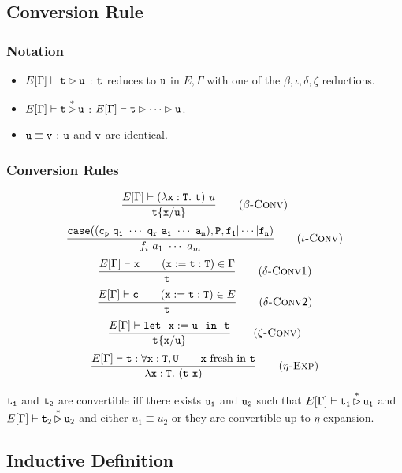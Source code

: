 \subsection{Conversion Rule}

\subsubsection{Notation}
\begin{itemize}
    \item $E[\Gamma]\vdash \tt t\rhd u$ : $\tt t$ reduces to $\tt u$ in $E,\Gamma$ with 
    one of the $\beta,\iota,\delta,\zeta$ reductions.
    \item $E[\Gamma]\vdash \tt t\mathop{\rhd}\limits^* u$ : $E[\Gamma]\vdash\tt t\rhd\cdots\rhd u$.
    \item $\tt u\equiv v$ : $\tt u$ and $\tt v$ are identical.
\end{itemize}

\subsubsection{Conversion Rules}
\begin{equation*}
\frac{E[\Gamma]\vdash(\lambda{\tt x:T.\ t})\ u}
    {\tt t\{x/u\}}
    \tag{\sc $\beta$-Conv}
\end{equation*}
\begin{equation*}
\frac{\tt case((c_p\ q_1\ \cdots\ q_r\ a_1\ \cdots\ a_m),P,f_1|\cdots|f_n)}
    {f_i\ a_1\ \cdots\ a_m}
    \tag{\sc $\iota$-Conv}
\end{equation*}
\begin{equation*}
\frac{E[\Gamma]\vdash{\tt x}\qquad ({\tt x:=t:T})\in\Gamma}
    {\tt t}
    \tag{\sc $\delta$-Conv1}
\end{equation*}
\begin{equation*}
\frac{E[\Gamma]\vdash{\tt c}\qquad ({\tt x:=t:T})\in E}
    {\tt t}
    \tag{\sc $\delta$-Conv2}
\end{equation*}
\begin{equation*}
\frac{E[\Gamma]\vdash \tt let\ \ x:=u\ \ in\ \ t}
    {\tt t\{x/u\}}
    \tag{\sc $\zeta$-Conv}
\end{equation*}
\begin{equation*}
\frac{E[\Gamma]\vdash \tt t:\forall x:T,U\qquad x\text{ fresh in }t}
    {\tt \lambda\tt x:T.\ (t\ x)}
    \tag{\sc $\eta$-Exp}
\end{equation*}

\begin{Def}[Convertibility]
$\tt t_1$ and $\tt t_2$ are convertible iff there exists $\tt u_1$ and $\tt u_2$ such that 
$E[\Gamma]\vdash \tt t_1\mathop{\rhd}\limits^* u_1$ and $E[\Gamma]\vdash \tt t_2\mathop{\rhd}\limits^* u_2$ 
and either $u_1\equiv u_2$ or they are convertible up to $\eta$-expansion.
\end{Def}

\subsection{Inductive Definition}

